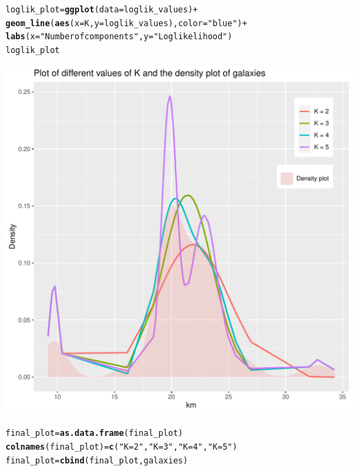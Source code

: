 \documentclass{article}\usepackage[]{graphicx}\usepackage[]{color}
\makeatletter
\def\maxwidth{ %
  \ifdim\Gin@nat@width>\linewidth
    \linewidth
  \else
    \Gin@nat@width
  \fi
}
\newcommand{\hlstr}[1]{\textcolor[rgb]{0.192,0.494,0.8}{#1}}%
\newcommand{\hlopt}[1]{\textcolor[rgb]{0,0,0}{#1}}%
\newcommand{\hlstd}[1]{\textcolor[rgb]{0.345,0.345,0.345}{#1}}%
\newcommand{\hlkwb}[1]{\textcolor[rgb]{0.69,0.353,0.396}{#1}}%
\newcommand{\hlkwc}[1]{\textcolor[rgb]{0.333,0.667,0.333}{#1}}%
\newcommand{\hlkwd}[1]{\textcolor[rgb]{0.737,0.353,0.396}{\textbf{#1}}}%
\newenvironment{kframe}{%
 \def\at@end@of@kframe{}%
 \ifinner\ifhmode%
  \def\at@end@of@kframe{\end{minipage}}%
  \begin{minipage}{\columnwidth}%
 \fi\fi%
 \def\FrameCommand##1{\hskip\@totalleftmargin \hskip-\fboxsep
 \colorbox{shadecolor}{##1}\hskip-\fboxsep
     \hskip-\linewidth \hskip-\@totalleftmargin \hskip\columnwidth}%
 \MakeFramed {\advance\hsize-\width
   \@totalleftmargin\z@ \linewidth\hsize
   \@setminipage}}%
 {\par\unskip\endMakeFramed%
 \at@end@of@kframe}
\newenvironment{knitrout}{}{} %
\makeatother
\begin{document}
\begin{knitrout}
\begin{kframe}
\begin{alltt}
\hlstd{loglik_plot} \hlkwb{=} \hlkwd{ggplot}\hlstd{(}\hlkwc{data} \hlstd{= loglik_values)} \hlopt{+}
  \hlkwd{geom_line}\hlstd{(}\hlkwd{aes}\hlstd{(}\hlkwc{x}\hlstd{=K,} \hlkwc{y}\hlstd{=loglik_values),} \hlkwc{color} \hlstd{=} \hlstr{"blue"}\hlstd{)} \hlopt{+}
  \hlkwd{labs}\hlstd{(}\hlkwc{x}\hlstd{=}\hlstr{"Number of components"}\hlstd{,}\hlkwc{y}\hlstd{=} \hlstr{"Log likelihood"}\hlstd{)}
\hlstd{loglik_plot}
\end{alltt}
\end{kframe}
\includegraphics[width=\maxwidth]{figure/unnamed-chunk-7-2} 
\begin{kframe}\begin{alltt}
\hlstd{final_plot} \hlkwb{=} \hlkwd{as.data.frame}\hlstd{(final_plot)}
\hlkwd{colnames}\hlstd{(final_plot)} \hlkwb{=} \hlkwd{c}\hlstd{(}\hlstr{"K = 2"}\hlstd{,} \hlstr{"K = 3"}\hlstd{,} \hlstr{"K = 4"}\hlstd{,} \hlstr{"K = 5"}\hlstd{)}
\hlstd{final_plot} \hlkwb{=} \hlkwd{cbind}\hlstd{(final_plot, galaxies)}


\end{alltt}
\end{kframe}
\end{knitrout}
\end{document}

